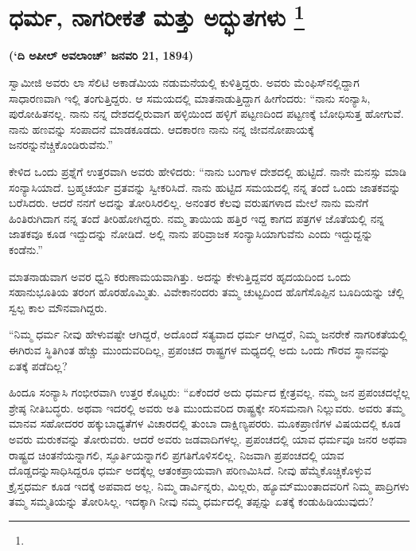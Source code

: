 
\chapter[ಧರ್ಮ ನಾಗರೀಕತೆ ಮತ್ತು ಅದ್ಭುತಗಳು ]{ಧರ್ಮ, ನಾಗರೀಕತೆ ಮತ್ತು ಅದ್ಭುತಗಳು \protect\footnote{}}

\centerline{\textbf{(‘ದಿ ಅಪೀಲ್​ ಅವಲಾಂಚ್​’ ಜನವರಿ 21, 1894)}}

\vskip 3pt

ಸ್ವಾಮೀಜಿ ಅವರು ಲಾ ಸೆಲಿಟಿ ಅಕಾಡೆಮಿಯ ನಡುಮನೆಯಲ್ಲಿ ಕುಳಿತ್ತಿದ್ದರು. ಅವರು ಮೆಂಫಿಸ್​ನಲ್ಲಿದ್ದಾಗ ಸಾಧಾರಣವಾಗಿ ಇಲ್ಲಿ ತಂಗುತ್ತಿದ್ದರು. ಆ ಸಮಯದಲ್ಲಿ ಮಾತನಾಡುತ್ತಿದ್ದಾಗ ಹೀಗೆಂದರು: “ನಾನು ಸಂನ್ಯಾಸಿ, ಪುರೋಹಿತನಲ್ಲ. ನಾನು ನನ್ನ ದೇಶದಲ್ಲಿರುವಾಗ ಹಳ್ಳಿಯಿಂದ ಹಳ್ಳಿಗೆ ಪಟ್ಟಣದಿಂದ ಪಟ್ಟಣಕ್ಕೆ ಬೋಧಿಸುತ್ತ ಹೋಗುವೆ. ನಾನು ಹಣವನ್ನು ಸಂಪಾದನೆ ಮಾಡಕೂಡದು. ಆದಕಾರಣ ನಾನು ನನ್ನ ಜೀವನೋಪಾಯಕ್ಕೆ ಜನರನ್ನು\break ನೆಚ್ಚಿಕೊಂಡಿರುವೆನು.”

\vskip 3pt

ಕೇಳಿದ ಒಂದು ಪ್ರಶ್ನೆಗೆ ಉತ್ತರವಾಗಿ ಅವರು ಹೇಳಿದರು: “ನಾನು ಬಂಗಾಳ ದೇಶದಲ್ಲಿ ಹುಟ್ಟಿದೆ. ನಾನೇ ಮನಸ್ಸು ಮಾಡಿ ಸಂನ್ಯಾಸಿಯಾದೆ. ಬ್ರಹ್ಮಚರ್ಯ ವ್ರತವನ್ನು ಸ್ವೀಕರಿಸಿದೆ. ನಾನು ಹುಟ್ಟಿದ ಸಮಯದಲ್ಲಿ ನನ್ನ ತಂದೆ ಒಂದು ಜಾತಕವನ್ನು ಬರೆಸಿದರು. ಆದರೆ ನನಗೆ ಅದನ್ನು ತೋರಿಸಿರಲಿಲ್ಲ. ಅನಂತರ ಕೆಲವು ವರುಷಗಳಾದ ಮೇಲೆ ನಾನು ಮನೆಗೆ ಹಿಂತಿರುಗಿದಾಗ ನನ್ನ ತಂದೆ ತೀರಿಹೋಗಿದ್ದರು. ನಮ್ಮ ತಾಯಿಯ ಹತ್ತಿರ ಇದ್ದ ಕಾಗದ ಪತ್ರಗಳ ಜೊತೆಯಲ್ಲಿ ನನ್ನ ಜಾತಕವೂ ಕೂಡ ಇದ್ದುದನ್ನು ನೋಡಿದೆ. ಅಲ್ಲಿ ನಾನು ಪರಿವ್ರಾಜಕ ಸಂನ್ಯಾಸಿಯಾಗುವೆನು ಎಂದು ಇದ್ದುದ್ದನ್ನು ಕಂಡೆನು.”

\vskip 3pt

ಮಾತನಾಡುವಾಗ ಅವರ ಧ್ವನಿ ಕರುಣಾಮಯವಾಗಿತ್ತು. ಅದನ್ನು ಕೇಳುತ್ತಿದ್ದವರ ಹೃದಯದಿಂದ ಒಂದು ಸಹಾನುಭೂತಿಯ ತರಂಗ ಹೊರಹೊಮ್ಮಿತು. ವಿವೇಕಾನಂದರು ತಮ್ಮ ಚುಟ್ಟದಿಂದ ಹೊಗೆಸೊಪ್ಪಿನ ಬೂದಿಯನ್ನು ಚೆಲ್ಲಿ ಸ್ವಲ್ಪ ಕಾಲ ಮೌನವಾಗಿದ್ದರು.

\vskip 3pt

“ನಿಮ್ಮ ಧರ್ಮ ನೀವು ಹೇಳುವಷ್ಟೇ ಆಗಿದ್ದರೆ, ಅದೊಂದೆ ಸತ್ಯವಾದ ಧರ್ಮ ಆಗಿದ್ದರೆ, ನಿಮ್ಮ ಜನರೇಕೆ ನಾಗರಿಕತೆಯಲ್ಲಿ ಈಗಿರುವ ಸ್ಥಿತಿಗಿಂತ ಹೆಚ್ಚು ಮುಂದುವರಿದಿಲ್ಲ, ಪ್ರಪಂಚದ ರಾಷ್ಟ್ರಗಳ ಮಧ್ಯದಲ್ಲಿ ಅದು ಒಂದು ಗೌರವ ಸ್ಥಾನವನ್ನು ಏತಕ್ಕೆ ಪಡೆದಿಲ್ಲ?

\vskip 3pt

ಹಿಂದೂ ಸಂನ್ಯಾಸಿ ಗಂಭೀರವಾಗಿ ಉತ್ತರ ಕೊಟ್ಟರು: “ಏಕೆಂದರೆ ಅದು ಧರ್ಮದ ಕ್ಷೇತ್ರವಲ್ಲ. ನಮ್ಮ ಜನ ಪ್ರಪಂಚದಲ್ಲೆಲ್ಲ ಶ್ರೇಷ್ಠ ನೀತಿಬದ್ಧರು. ಅಥವಾ ಇದರಲ್ಲಿ ಅವರು ಅತಿ ಮುಂದುವರಿದ ರಾಷ್ಟ್ರಕ್ಕೇ ಸರಿಸಮನಾಗಿ ನಿಲ್ಲುವರು. ಅವರು ತಮ್ಮ ಮಾನವ ಸಹೋದರರ ಹಕ್ಕುಬಾಧ್ಯತೆಗಳ ವಿಚಾರದಲ್ಲಿ ತುಂಬಾ ದಾಕ್ಷಿಣ್ಯಪರರು. ಮೂಕಪ್ರಾಣಿಗಳ ವಿಷಯದಲ್ಲಿ ಕೂಡ ಅವರು ಮರುಕವನ್ನು ತೋರುವರು. ಆದರೆ ಅವರು ಜಡವಾದಿಗಳಲ್ಲ. ಪ್ರಪಂಚದಲ್ಲಿ ಯಾವ ಧರ್ಮವೂ ಜನರ ಅಥವಾ ರಾಷ್ಟ್ರದ ಚಿಂತನೆಯನ್ನಾಗಲಿ, ಸ್ಫೂರ್ತಿಯನ್ನಾಗಲಿ ಪ್ರಗತಿಗೊಳಿಸಲಿಲ್ಲ. ನಿಜವಾಗಿ ಪ್ರಪಂಚದಲ್ಲಿ ಯಾವ ದೊಡ್ಡದನ್ನು\break ಸಾಧಿಸಿದ್ದರೂ ಧರ್ಮ ಅದಕ್ಕೆಲ್ಲ ಆತಂಕಪ್ರಾಯವಾಗಿ ಪರಿಣಮಿಸಿದೆ. ನೀವು ಹೆಮ್ಮೆ\break ಕೊಚ್ಚಿಕೊಳ್ಳುವ ಕ್ರೈಸ್ತಧರ್ಮ ಕೂಡ ಇದಕ್ಕೆ ಅಪವಾದ ಅಲ್ಲ. ನಿಮ್ಮ ಡಾರ್ವಿನ್ನರು, ಮಿಲ್ಲರು, ಹ್ಯೂಮ್​ ಮುಂತಾದವರಿಗೆ ನಿಮ್ಮ ಪಾದ್ರಿಗಳು ತಮ್ಮ ಸಮ್ಮತಿಯನ್ನು ತೋರಿಸಿಲ್ಲ. ಇದಕ್ಕಾಗಿ ನೀವು ನಮ್ಮ ಧರ್ಮದಲ್ಲಿ ತಪ್ಪನ್ನು ಏತಕ್ಕೆ ಕಂಡುಹಿಡಿಯುವುದು?

